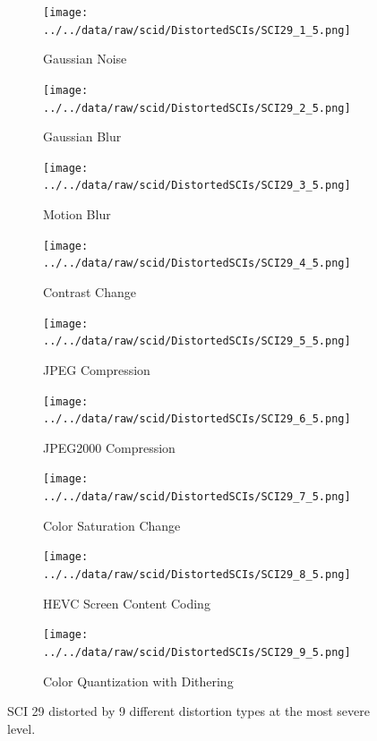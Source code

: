 \begin{figure}
    \centering
    \begin{subfigure}[b]{0.42\textwidth}
        \texttt{[image: ../../data/raw/scid/DistortedSCIs/SCI29\_1\_5.png]}
        \caption{Gaussian Noise}
        \label{fig:distortion_type_1}
    \end{subfigure}
    \hfill
    \begin{subfigure}[b]{0.42\textwidth}
        \texttt{[image: ../../data/raw/scid/DistortedSCIs/SCI29\_2\_5.png]}
        \caption{Gaussian Blur}
        \label{fig:distortion_type_2}
    \end{subfigure}
    \newline
    \begin{subfigure}[b]{0.42\textwidth}
        \texttt{[image: ../../data/raw/scid/DistortedSCIs/SCI29\_3\_5.png]}
        \caption{Motion Blur}
        \label{fig:distortion_type_3}
    \end{subfigure}
    \hfill
    \begin{subfigure}[b]{0.42\textwidth}
        \texttt{[image: ../../data/raw/scid/DistortedSCIs/SCI29\_4\_5.png]}
        \caption{Contrast Change}
        \label{fig:distortion_type_4}
    \end{subfigure}
    \newline
    \begin{subfigure}[b]{0.42\textwidth}
        \texttt{[image: ../../data/raw/scid/DistortedSCIs/SCI29\_5\_5.png]}
        \caption{JPEG Compression}
        \label{fig:distortion_type_5}
    \end{subfigure}
    \hfill
    \begin{subfigure}[b]{0.42\textwidth}
        \texttt{[image: ../../data/raw/scid/DistortedSCIs/SCI29\_6\_5.png]}
        \caption{JPEG2000 Compression}
        \label{fig:distortion_type_6}
    \end{subfigure}
    \newline
    \begin{subfigure}[b]{0.42\textwidth}
        \texttt{[image: ../../data/raw/scid/DistortedSCIs/SCI29\_7\_5.png]}
        \caption{Color Saturation Change}
        \label{fig:distortion_type_7}
    \end{subfigure}
    \hfill
    \begin{subfigure}[b]{0.42\textwidth}
        \texttt{[image: ../../data/raw/scid/DistortedSCIs/SCI29\_8\_5.png]}
        \caption{HEVC Screen Content Coding}
        \label{fig:distortion_type_8}
    \end{subfigure}
    \newline
    \begin{subfigure}[b]{0.42\textwidth}
        \texttt{[image: ../../data/raw/scid/DistortedSCIs/SCI29\_9\_5.png]}
        \caption{Color Quantization with Dithering}
        \label{fig:distortion_type_9}
    \end{subfigure}
    \caption{SCI 29 distorted by 9 different distortion types at the most severe level.}
    \label{fig:distortion_types}
\end{figure}

